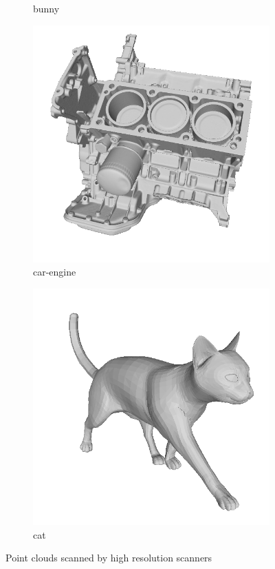 \begin{figure}[!h]
\begin{subfigure}[b]{0.23\linewidth}
		\caption{bunny}
	\end{subfigure}
	\begin{subfigure}[b]{0.23\linewidth}
		\includegraphics[width=\linewidth]{./Figures/train-dataset/06.car-engine.png}
		\caption{car-engine}
	\end{subfigure}
	\begin{subfigure}[b]{0.23\linewidth}
		\includegraphics[width=\linewidth]{./Figures/train-dataset/07.cat.png}
		\caption{cat}
	\end{subfigure}
	
	\label{fig:dataset-demo}
	\caption{Point clouds scanned by high resolution scanners}
\end{figure}


